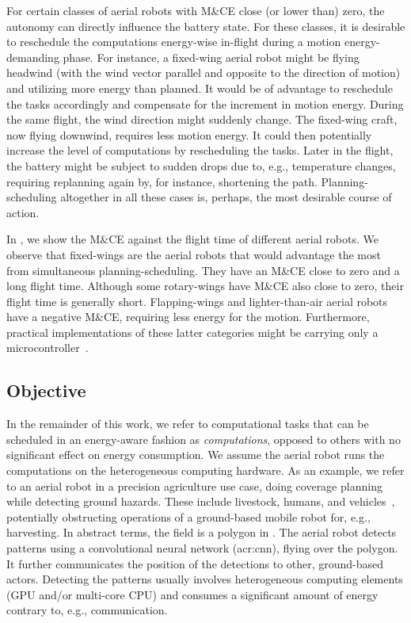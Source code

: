 For certain classes of aerial robots with M\&CE close (or lower than) zero, the autonomy can directly influence the battery state. For these classes, it is desirable to reschedule the computations energy-wise in-flight during a motion energy-demanding phase. For instance, a fixed-wing aerial robot might be flying headwind (with the wind vector parallel and opposite to the direction of motion) and utilizing more energy than planned. It would be of advantage to reschedule the tasks accordingly and compensate for the increment in motion energy. During the same flight, the wind direction might suddenly change. The fixed-wing craft, now flying downwind, requires less motion energy. It could then potentially increase the level of computations by rescheduling the tasks. Later in the flight, the battery might be subject to sudden drops due to, e.g., temperature changes, requiring replanning again by, for instance, shortening the path. Planning-scheduling altogether in all these cases is, perhaps, the most desirable course of action.

In , we show the M\&CE against the flight time of different aerial robots. We observe that fixed-wings are the aerial robots that would advantage the most from simultaneous planning-scheduling. They have an M\&CE close to zero and a long flight time. Although some rotary-wings have M\&CE also close to zero, their flight time is generally short. Flapping-wings and lighter-than-air aerial robots have a negative M\&CE, requiring less energy for the motion. Furthermore, practical implementations of these latter categories might be carrying only a microcontroller~\citep{groen2010improving}.

\subsection{Objective}
\label{sec:objective}

In the remainder of this work, we refer to computational tasks that can be scheduled in an energy-aware fashion as \textit{computations}, opposed to others with no significant effect on energy consumption. We assume the aerial robot runs the computations on the heterogeneous computing hardware. As an example, we refer to an aerial robot in a precision agriculture use case, doing coverage planning while detecting ground hazards. These include livestock, humans, and vehicles~\citep{zamanakos2020energy}, potentially obstructing operations of a ground-based mobile robot for, e.g., harvesting. In abstract terms, the field is a polygon in . The aerial robot detects patterns using a convolutional neural network (\Gls{acr:cnn}), flying over the polygon. It further communicates the position of the detections to other, ground-based actors. Detecting the patterns usually involves heterogeneous computing elements (GPU and/or multi-core CPU) and consumes a significant amount of energy contrary to, e.g., communication.

